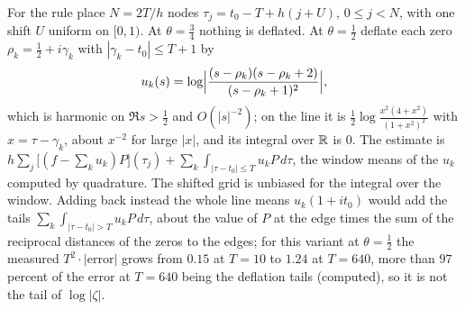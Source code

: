 For the rule place $N=2T/h$ nodes $\tau_j=t_0-T+h(j+U)$, $0\le j<N$, with one shift $U$ uniform on $[0,1)$. At $\theta=\frac34$ nothing is deflated. At $\theta=\frac12$ deflate each zero $\rho_k=\frac12+i\gamma_k$ with $|\gamma_k-t_0|\le T+1$ by
\[
u_k(s)=\log\Bigl|\frac{(s-\rho_k)(s-\rho_k+2)}{(s-\rho_k+1)^2}\Bigr|,
\]
which is harmonic on $\Re s>\frac12$ and $O(|s|^{-2})$; on the line it is $\frac12\log\frac{x^2(4+x^2)}{(1+x^2)^2}$ with $x=\tau-\gamma_k$, about $x^{-2}$ for large $|x|$, and its integral over $\mathbb{R}$ is $0$. The estimate is $h\sum_j\bigl[(f-\sum_ku_k)P\bigr](\tau_j)+\sum_k\int_{|\tau-t_0|\le T}u_kP\,d\tau$, the window means of the $u_k$ computed by quadrature. The shifted grid is unbiased for the integral over the window. Adding back instead the whole line means $u_k(1+it_0)$ would add the tails $\sum_k\int_{|\tau-t_0|>T}u_kP\,d\tau$, about the value of $P$ at the edge times the sum of the reciprocal distances of the zeros to the edges; for this variant at $\theta=\frac12$ the measured $T^2\cdot|\mathrm{error}|$ grows from $0.15$ at $T=10$ to $1.24$ at $T=640$, more than $97$ percent of the error at $T=640$ being the deflation tails (computed), so it is not the tail of $\log|\zeta|$.

